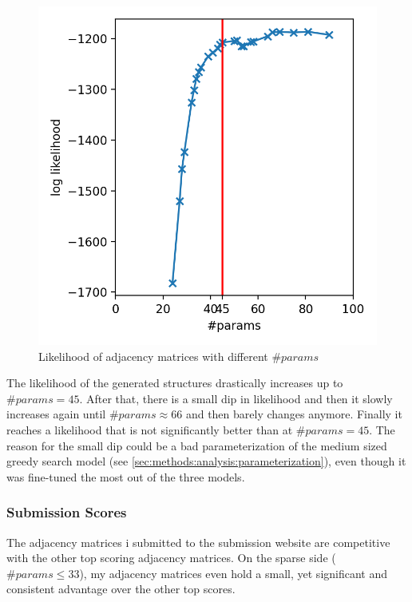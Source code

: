 \documentclass[sigconf, fleqn, prologue, dvipsnames]{acmart}
\begin{document}
\begin{figure}
	\centering
	\includegraphics[scale=0.5]{graphics/likelihoods.png}
	\caption{Likelihood of adjacency matrices with different $\#params$}
	\label{fig:results:likelihood}
\end{figure}

The likelihood of the generated structures drastically increases up to $\#params = 45$.
After that, there is a small dip in likelihood and then it slowly increases again until $\#params \approx 66$ and then barely changes anymore.
Finally it reaches a likelihood that is not significantly better than at $\#params = 45$.
The reason for the small dip could be a bad parameterization of the medium sized greedy search model (see \autoref{sec:methods:analysis:parameterization}), even though it was fine-tuned the most out of the three models.

\subsubsection{Submission Scores}
The adjacency matrices i submitted to the submission website are competitive with the other top scoring adjacency matrices.
On the sparse side ($\#params \leq 33$), my adjacency matrices even hold a small, yet significant and consistent advantage over the other top scores.
\end{document}

